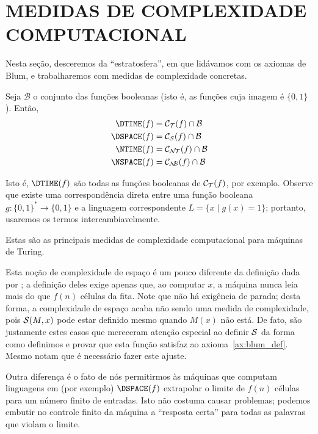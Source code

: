 \section{MEDIDAS DE COMPLEXIDADE COMPUTACIONAL}
\label{sec:default_measures}

Nesta seção,
desceremos da ``estratosfera'',
em que lidávamos com os axiomas de Blum,
e trabalharemos com medidas de complexidade concretas.

\begin{provisionaldefinition}
    Seja $\mathcal B$ o conjunto das funções booleanas
    (isto é, as funções cuja imagem é $\{0, 1\}$).
    Então,
    \begin{align*}
        \DTIME(f) &= \mathcal C_\PhiDT(f) \cap \mathcal B \\
        \DSPACE(f) &= \mathcal C_\PhiDS(f) \cap \mathcal B \\
        \NTIME(f) &= \mathcal C_\PhiNT(f) \cap \mathcal B \\
        \NSPACE(f) &= \mathcal C_\PhiNS(f) \cap \mathcal B
    \end{align*}
\end{provisionaldefinition}

Isto é, $\DTIME(f)$ são todas as funções booleanas de $\mathcal C_{\mathcal{T}}(f)$,
por exemplo.
Observe que existe uma correspondência direta entre
uma função booleana $g : \{0, 1\}^* \to \{0, 1\}$
e a linguagem correspondente $L = \{x \mid g(x) = 1\}$;
portanto,
usaremos os termos intercambiavelmente.

Estas são as principais medidas de complexidade computacional
para máquinas de Turing.

Esta noção de complexidade de espaço
é um pouco diferente da definição dada por
;
a definição deles exige apenas que,
ao computar $x$,
a máquina nunca leia mais do que $f(n)$ células da fita.
Note que não há exigência de parada;
desta forma,
a complexidade de espaço acaba não sendo uma medida de complexidade,
pois ${\mathcal{S}}(M, x)$ pode estar definido
mesmo quando $M(x)$ não está.
De fato,
são justamente estes casos que mereceram
atenção especial ao definir ${\mathcal{S}}$
da forma como definimos
e provar que esta função satisfaz ao axioma~\ref{ax:blum_def}.
Mesmo 
notam que é necessário fazer este ajuste.

Outra diferença é o fato de nós permitirmos
às máquinas que computam linguagens em
(por exemplo) $\DSPACE(f)$
extrapolar o limite de $f(n)$ células
para um número finito de entradas.
Isto não costuma causar problemas;
podemos embutir no controle finito da máquina
a ``resposta certa''
para todas as palavras que violam o limite.

